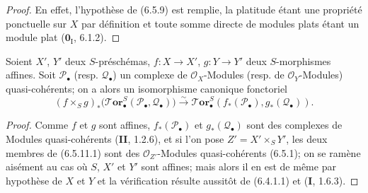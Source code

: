 \begin{proof}
En effet, l'hypothèse de (6.5.9) est remplie, la platitude étant une propriété
ponctuelle sur $X$ par définition et toute somme directe de modules plats étant
un module plat ($\mathbf{0}_{\mathrm I}$, 6.1.2).
\end{proof}

\begin{proposition}[6.5.11]
Soient $X'$, $Y'$ deux $S$-préschémas, $f:X\to X'$, $g:Y\to Y'$ deux
$S$-morphismes affines. Soit $\mathscr P_\bullet$ \textup{(resp.}
$\mathscr Q_\bullet$\textup{)} un complexe de $\mathscr O_X$-Modules \textup{(resp.} de
$\mathscr O_Y$-Modules\textup{)} quasi-cohérents; on a alors un isomorphisme canonique
fonctoriel
\[
  (f\times_S g)_*
  \bigl(\boldsymbol{\mathscr{T}\!or}_\bullet^S
    (\mathscr P_\bullet,\mathscr Q_\bullet)\bigr)
  \xrightarrow{\sim}
  \boldsymbol{\mathscr{T}\!or}_\bullet^S
  (f_*(\mathscr P_\bullet),g_*(\mathscr Q_\bullet)).
  \tag{6.5.11.1}\label{III.6.5.11.1.fr}
\]
\end{proposition}

\begin{proof}
Comme $f$ et $g$ sont affines, $f_*(\mathscr P_\bullet)$ et
$g_*(\mathscr Q_\bullet)$ sont des complexes de Modules quasi-cohérents
(\textbf{II}, 1.2.6), et si l'on pose $Z'=X'\times_S Y'$, les deux membres de (6.5.11.1)
sont des $\mathscr O_{Z'}$-Modules quasi-cohérents (6.5.1); on se ramène
aisément au cas où $S$, $X'$ et $Y'$ sont affines; mais alors il en est de même
par hypothèse de $X$ et $Y$ et la vérification résulte aussitôt de (6.4.1.1) et
(\textbf{I}, 1.6.3).
\end{proof}

